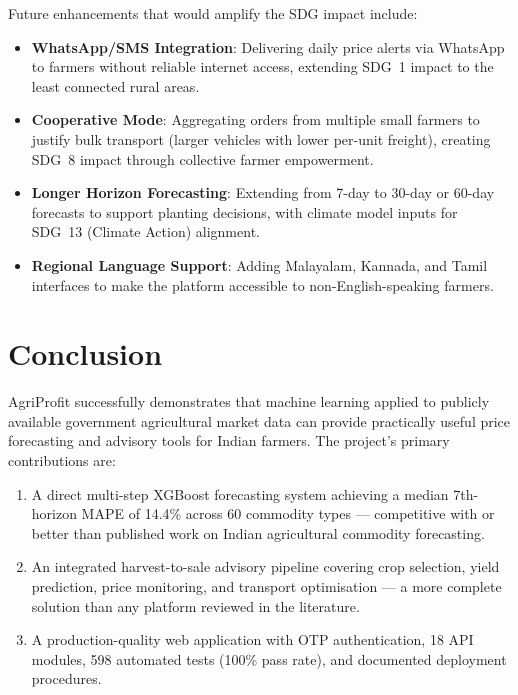 \documentclass[12pt,a4paper]{report}
\begin{document}
Future enhancements that would amplify the SDG impact include:

\begin{itemize}
    \item \textbf{WhatsApp/SMS Integration}: Delivering daily price alerts via WhatsApp
    to farmers without reliable internet access, extending SDG~1 impact to the least
    connected rural areas.
    \item \textbf{Cooperative Mode}: Aggregating orders from multiple small farmers to
    justify bulk transport (larger vehicles with lower per-unit freight), creating SDG~8
    impact through collective farmer empowerment.
    \item \textbf{Longer Horizon Forecasting}: Extending from 7-day to 30-day or 60-day
    forecasts to support planting decisions, with climate model inputs for SDG~13 (Climate
    Action) alignment.
    \item \textbf{Regional Language Support}: Adding Malayalam, Kannada, and Tamil
    interfaces to make the platform accessible to non-English-speaking farmers.
\end{itemize}

\chapter{Conclusion}

AgriProfit successfully demonstrates that machine learning applied to publicly available
government agricultural market data can provide practically useful price forecasting and
advisory tools for Indian farmers. The project's primary contributions are:

\begin{enumerate}
    \item A direct multi-step XGBoost forecasting system achieving a median 7th-horizon
    MAPE of 14.4\% across 60 commodity types --- competitive with or better than published
    work on Indian agricultural commodity forecasting.
    \item An integrated harvest-to-sale advisory pipeline covering crop selection, yield
    prediction, price monitoring, and transport optimisation --- a more complete solution
    than any platform reviewed in the literature.
    \item A production-quality web application with OTP authentication, 18 API modules,
    598 automated tests (100\% pass rate), and documented deployment procedures.
\end{enumerate}
\end{document}
